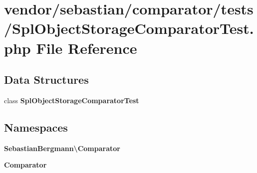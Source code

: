 \section{vendor/sebastian/comparator/tests/\+Spl\+Object\+Storage\+Comparator\+Test.php File Reference}
\label{_spl_object_storage_comparator_test_8php}
\subsection*{Data Structures}
\begin{DoxyCompactItemize}
\item 
class {\bf Spl\+Object\+Storage\+Comparator\+Test}
\end{DoxyCompactItemize}
\subsection*{Namespaces}
\begin{DoxyCompactItemize}
\item 
 {\bf Sebastian\+Bergmann\textbackslash{}\+Comparator}
\item 
 {\bf Comparator}
\end{DoxyCompactItemize}
